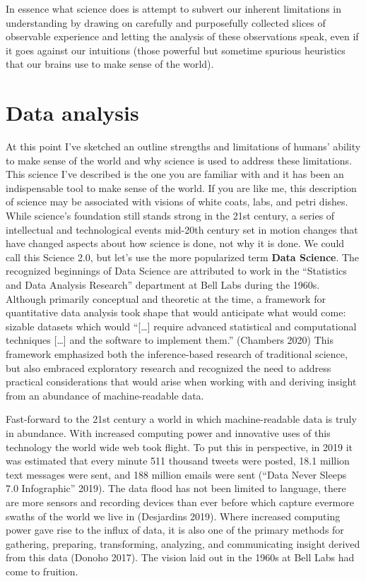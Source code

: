 \documentclass[
  letterpaper,
]{scrbook}
\begin{document}
In essence what science does is attempt to subvert our inherent
limitations in understanding by drawing on carefully and purposefully
collected slices of observable experience and letting the analysis of
these observations speak, even if it goes against our intuitions (those
powerful but sometime spurious heuristics that our brains use to make
sense of the world).

\hypertarget{data-analysis}{%
\section{Data analysis}\label{data-analysis}}

At this point I've sketched an outline strengths and limitations of
humans' ability to make sense of the world and why science is used to
address these limitations. This science I've described is the one you
are familiar with and it has been an indispensable tool to make sense of
the world. If you are like me, this description of science may be
associated with visions of white coats, labs, and petri dishes. While
science's foundation still stands strong in the 21st century, a series
of intellectual and technological events mid-20th century set in motion
changes that have changed aspects about how science is done, not why it
is done. We could call this Science 2.0, but let's use the more
popularized term \textbf{Data Science}. The
recognized beginnings of Data Science are attributed to work in the
``Statistics and Data Analysis Research'' department at Bell Labs during
the 1960s. Although primarily conceptual and theoretic at the time, a
framework for quantitative data analysis took shape that would
anticipate what would come: sizable datasets which would ``{[}\ldots{]}
require advanced statistical and computational techniques {[}\ldots{]}
and the software to implement them.'' (Chambers 2020) This framework
emphasized both the inference-based research of traditional science, but
also embraced exploratory research and recognized the need to address
practical considerations that would arise when working with and deriving
insight from an abundance of machine-readable data.

Fast-forward to the 21st century a world in which machine-readable data
is truly in abundance. With increased computing power and innovative
uses of this technology the world wide web took flight. To put this in
perspective, in 2019 it was estimated that every minute 511 thousand
tweets were posted, 18.1 million text messages were sent, and 188
million emails were sent ({``Data Never Sleeps 7.0 Infographic''} 2019).
The data flood has not been limited to language, there are more sensors
and recording devices than ever before which capture evermore swaths of
the world we live in (Desjardins 2019). Where increased computing power
gave rise to the influx of data, it is also one of the primary methods
for gathering, preparing, transforming, analyzing, and communicating
insight derived from this data (Donoho 2017). The vision laid out in the
1960s at Bell Labs had come to fruition.
\end{document}
